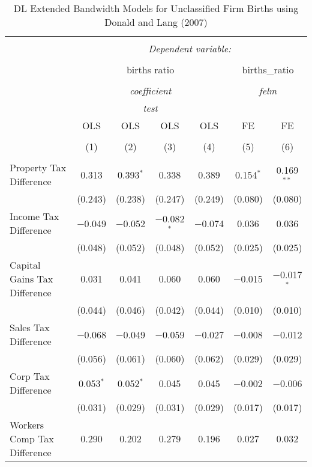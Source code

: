 
\begin{table}[!htbp] \centering 
  \caption{DL Extended Bandwidth Models for  Unclassified Firm Births using Donald and Lang (2007)} 
  \label{} 
\begin{tabular}{@{\extracolsep{5pt}}lcccccc} 
\\[-1.8ex]\hline 
\hline \\[-1.8ex] 
 & \multicolumn{6}{c}{\textit{Dependent variable:}} \\ 
\cline{2-7} 
\\[-1.8ex] & \multicolumn{4}{c}{births ratio} & \multicolumn{2}{c}{births\_ratio} \\ 
\\[-1.8ex] & \multicolumn{4}{c}{\textit{coefficient}} & \multicolumn{2}{c}{\textit{felm}} \\ 
 & \multicolumn{4}{c}{\textit{test}} & \multicolumn{2}{c}{\textit{}} \\ 
 & OLS & OLS & OLS & OLS & FE & FE \\ 
\\[-1.8ex] & (1) & (2) & (3) & (4) & (5) & (6)\\ 
\hline \\[-1.8ex] 
 Property Tax Difference & 0.313 & 0.393$^{*}$ & 0.338 & 0.389 & 0.154$^{*}$ & 0.169$^{**}$ \\ 
  & (0.243) & (0.238) & (0.247) & (0.249) & (0.080) & (0.080) \\ 
  Income Tax Difference & $-$0.049 & $-$0.052 & $-$0.082$^{*}$ & $-$0.074 & 0.036 & 0.036 \\ 
  & (0.048) & (0.052) & (0.048) & (0.052) & (0.025) & (0.025) \\ 
  Capital Gains Tax Difference & 0.031 & 0.041 & 0.060 & 0.060 & $-$0.015 & $-$0.017$^{*}$ \\ 
  & (0.044) & (0.046) & (0.042) & (0.044) & (0.010) & (0.010) \\ 
  Sales Tax Difference & $-$0.068 & $-$0.049 & $-$0.059 & $-$0.027 & $-$0.008 & $-$0.012 \\ 
  & (0.056) & (0.061) & (0.060) & (0.062) & (0.029) & (0.029) \\ 
  Corp Tax Difference & 0.053$^{*}$ & 0.052$^{*}$ & 0.045 & 0.045 & $-$0.002 & $-$0.006 \\ 
  & (0.031) & (0.029) & (0.031) & (0.029) & (0.017) & (0.017) \\ 
  Workers Comp Tax Difference & 0.290 & 0.202 & 0.279 & 0.196 & 0.027 & 0.032 \\ 

\end{tabular}
\end{table}
